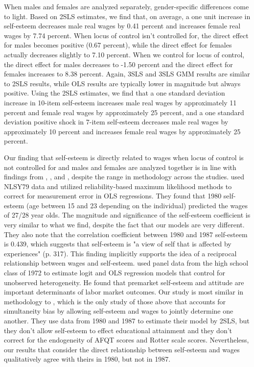 \documentclass[12pt]{report}
\newcommand{\citee}[1]{\citename{#1} \citeyear{#1}}
\begin{document}
When males and females are analyzed separately, gender-specific differences come to light. Based on 2SLS estimates, we find that, on average, a one unit increase in self-esteem decreases male real wages by 0.41 percent and increases female real wages by 7.74 percent. When locus of control isn't controlled for, the direct effect for males becomes positive (0.67 percent), while the direct effect for females actually decreases slightly to 7.10 percent. When we control for locus of control, the direct effect for males decreases to -1.50 percent and the direct effect for females increases to 8.38 percent. Again, 3SLS and 3SLS GMM results are similar to 2SLS results, while OLS results are typically lower in magnitude but always positive. Using the 2SLS estimates, we find that a one standard deviation increase in 10-item self-esteem increases male real wages by approximately 11 percent and female real wages by approximately 25 percent, and a one standard deviation positive shock in 7-item self-esteem decreases male real wages by approximately 10 percent and increases female real wages by approximately 25 percent.

Our finding that self-esteem is directly related to wages when locus of control is not controlled for and males and females are analyzed together is in line with findings from \citee{GVD1997}, \citee{M2001}, and \citee{W2006}, despite the range in methodology across the studies. \citee{M2001} used NLSY79 data and utilized reliability-based maximum likelihood methods to correct for measurement error in OLS regressions. They found that 1980 self-esteem (age between 15 and 23 depending on the individual) predicted the wages of 27/28 year olds. The magnitude and significance of the self-esteem coefficient is very similar to what we find, despite the fact that our models are very different. They also note that the correlation coefficient between 1980 and 1987 self-esteem is 0.439, which suggests that self-esteem is "a view of self that is affected by experiences" (p. 317). This finding implicitly supports the idea of a reciprocal relationship between wages and self-esteem. \citee{W2006} used panel data from the high school class of 1972 to estimate logit and OLS regression models that control for unobserved heterogeneity. He found that premarket self-esteem and attitude are important determinants of labor market outcomes. Our study is most similar in methodology to \citee{GVD1997}, which is the only study of those above that accounts for simultaneity bias by allowing self-esteem and wages to jointly determine one another. They use data from 1980 and 1987 to estimate their model by 2SLS, but they don't allow self-esteem to effect educational attainment and they don't correct for the endogeneity of AFQT scores and Rotter scale scores. Nevertheless, our results that consider the direct relationship between self-esteem and wages qualitatively agree with theirs in 1980, but not in 1987.
\end{document}
